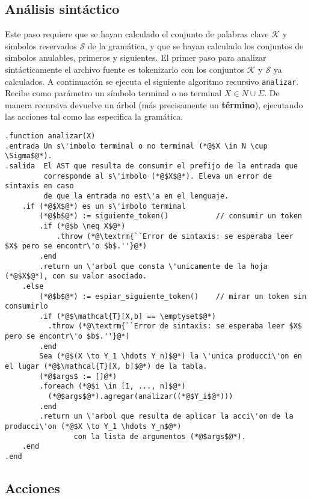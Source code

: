 \documentclass{article}
\renewcommand{\emptyset}{\varnothing}
\begin{document}
\subsection{An\'alisis sint\'actico}

Este paso requiere que se hayan calculado el conjunto de palabras clave $\mathcal{K}$ y s\'imbolos reservados $\mathcal{S}$
de la gram\'atica, y que se hayan calculado los conjuntos de s\'imbolos anulables, primeros
y siguientes.
El primer paso para analizar sint\'acticamente el archivo fuente es tokenizarlo con
los conjuntos $\mathcal{K}$ y $\mathcal{S}$ ya calculados.
A continuaci\'on se ejecuta el siguiente algoritmo recursivo \texttt{analizar}.
Recibe como par\'ametro un s\'imbolo terminal o no terminal $X \in N \cup \Sigma$.
De manera recursiva devuelve un \'arbol (m\'as precisamente un {\bf t\'ermino}),
ejecutando las acciones tal como las especifica la gram\'atica.

\begin{lstlisting}
.function analizar(X)
.entrada Un s\'imbolo terminal o no terminal (*@$X \in N \cup \Sigma$@*).
.salida  El AST que resulta de consumir el prefijo de la entrada que
         corresponde al s\'imbolo (*@$X$@*). Eleva un error de sintaxis en caso
         de que la entrada no est\'a en el lenguaje.
    .if (*@$X$@*) es un s\'imbolo terminal
        (*@$b$@*) := siguiente_token()           // consumir un token
        .if (*@$b \neq X$@*)
            .throw (*@\textrm{``Error de sintaxis: se esperaba leer $X$ pero se encontr\'o $b$.''}@*)
        .end
        .return un \'arbol que consta \'unicamente de la hoja (*@$X$@*), con su valor asociado.
    .else
        (*@$b$@*) := espiar_siguiente_token()    // mirar un token sin consumirlo
        .if (*@$\mathcal{T}[X,b] == \emptyset$@*)
          .throw (*@\textrm{``Error de sintaxis: se esperaba leer $X$ pero se encontr\'o $b$.''}@*)
        .end
        Sea (*@$(X \to Y_1 \hdots Y_n)$@*) la \'unica producci\'on en el lugar (*@$\mathcal{T}[X, b]$@*) de la tabla.
        (*@$args$ := []@*)
        .foreach (*@$i \in [1, ..., n]$@*)
          (*@$args$@*).agregar(analizar((*@$Y_i$@*)))
        .end
        .return un \'arbol que resulta de aplicar la acci\'on de la producci\'on (*@$X \to Y_1 \hdots Y_n$@*)
                con la lista de argumentos (*@$args$@*).
    .end
.end
\end{lstlisting}

\subsection{Acciones}
\end{document}
